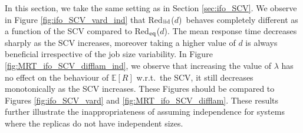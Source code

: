 \documentclass[12pt]{report}
\newcommand{\Redid}{Red$_{\textup{eq}}$($d$)}
\newcommand{\Redind}{Red$_{\textup{iid}}$($d$)}
\newcommand{\E}{\mathbb{E}}
\begin{document}
In this section, we take the same setting as in Section \ref{sec:ifo_SCV}. We observe in Figure \ref{fig:ifo_SCV_vard_ind} that \Redind\ behaves completely different as a function of the SCV compared to \Redid . The mean response time decreases sharply as the SCV increases, moreover taking a higher value of $d$ is always beneficial irrespective of the job size variability. In Figure \ref{fig:MRT_ifo_SCV_difflam_ind}, we observe that increasing the value of $\lambda$ has no effect on the behaviour of $\E[R]$ w.r.t.~the SCV, it still decreases monotonically as the SCV increases. These Figures should be compared to Figures \ref{fig:ifo_SCV_vard} and \ref{fig:MRT_ifo_SCV_difflam}.
These results further illustrate the inappropriateness of assuming independence
for systems where the replicas do not have independent sizes.
\end{document}
